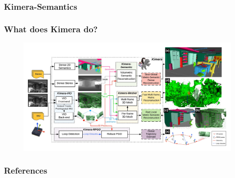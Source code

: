 \documentclass[11pt]{beamer}
\begin{document}
\begin{frame}
\frametitle{Kimera-Semantics}
    \begin{figure}[ht]
        \centering
    \end{figure}
\end{frame}
\begin{frame}
\frametitle{What does Kimera do?}
\begin{figure}
    \includegraphics[width=\linewidth]{kimera_chart_23.jpeg} 
\end{figure}
\end{frame}
\begin{frame}[allowframebreaks]
\footnotesize
  \frametitle{References}
  
{}
\end{frame}
\end{document}
